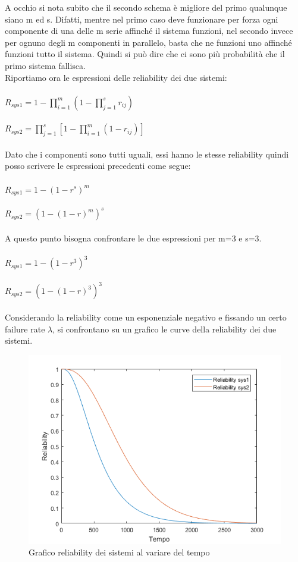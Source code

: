 	A occhio si nota subito che il secondo schema è migliore del primo qualunque siano m ed s. Difatti, mentre nel primo caso deve funzionare per forza ogni componente di una delle m serie affinché il sistema funzioni, nel secondo invece per ognuno degli m componenti in parallelo, basta che ne funzioni uno affinché funzioni tutto il sistema. Quindi si può dire che ci sono più probabilità che il primo sistema fallisca.\\
	Riportiamo ora le espressioni delle reliability dei due sistemi:\\\\
	$ R_{sys1}=1-\prod_{i=1}^{m}(1-\prod_{j=1}^{s}r_{ij}) $\\\\
	$ R_{sys2}=\prod_{j=1}^{s}[1-\prod_{i=1}^{m}(1-r_{ij})] $\\\\
	Dato che i componenti sono tutti uguali, essi hanno le stesse reliability quindi posso scrivere le espressioni precedenti come segue:\\\\
	$ R_{sys1}=1-(1-r^{s})^{m} $\\\\
	$ R_{sys2}=(1-(1-r)^{m})^{s} $\\\\
	A questo punto bisogna confrontare le due espressioni per m=3 e s=3.\\\\
	$ R_{sys1}=1-(1-r^{3})^{3} $\\\\
	$ R_{sys2}=(1-(1-r)^{3})^{3} $\\\\
	Considerando la reliability come un esponenziale negativo e fissando un certo failure rate $\lambda$, si confrontano su un grafico le curve della reliability dei due sistemi.
	
	\begin{figure}[H]
		\centering
		\includegraphics[scale=0.75]{./immagine/grafico_rel_es2.png}
		\caption{Grafico reliability dei sistemi al variare del tempo}
		\label{fig:grafico_rel_es2}
	\end{figure} 
	
